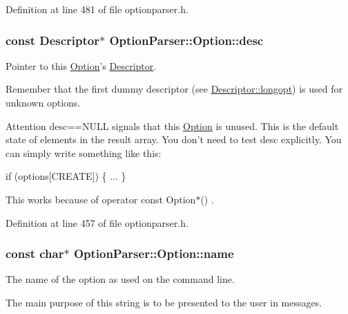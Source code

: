 Definition at line 481 of file optionparser.\-h.

\hypertarget{class_option_parser_1_1_option_a9ea2f4b0658ab175b7f0f0c204671fa9}{
\subsubsection[{desc}]{\setlength{\rightskip}{0pt plus 5cm}const {\bf Descriptor}$\ast$ Option\-Parser\-::\-Option\-::desc}}\label{class_option_parser_1_1_option_a9ea2f4b0658ab175b7f0f0c204671fa9}


Pointer to this \hyperlink{class_option_parser_1_1_option}{Option}'s \hyperlink{struct_option_parser_1_1_descriptor}{Descriptor}. 

Remember that the first dummy descriptor (see \hyperlink{struct_option_parser_1_1_descriptor_ab9db8207bae68dd5c4ee83e05189a9d0}{Descriptor\-::longopt}) is used for unknown options.

\begin{DoxyAttention}{Attention}
{\ttfamily desc==N\-U\-L\-L} signals that this \hyperlink{class_option_parser_1_1_option}{Option} is unused. This is the default state of elements in the result array. You don't need to test {\ttfamily desc} explicitly. You can simply write something like this\-: 
\begin{DoxyCode}
\textcolor{keywordflow}{if} (options[CREATE])
\{
  ...
\}
\end{DoxyCode}
 This works because of {\ttfamily  operator const Option$\ast$() }. 
\end{DoxyAttention}


Definition at line 457 of file optionparser.\-h.

\hypertarget{class_option_parser_1_1_option_abea386c9b8b1a810a2eb776d338fdfab}{
\subsubsection[{name}]{\setlength{\rightskip}{0pt plus 5cm}const char$\ast$ Option\-Parser\-::\-Option\-::name}}\label{class_option_parser_1_1_option_abea386c9b8b1a810a2eb776d338fdfab}


The name of the option as used on the command line. 

The main purpose of this string is to be presented to the user in messages.

